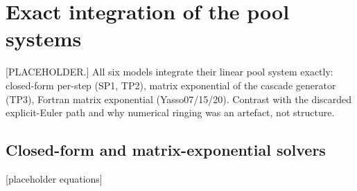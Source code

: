 \documentclass[../HIKET_draft_v1.tex]{subfiles}
\begin{document}
\section{Exact integration of the pool systems}
\label{app:exact}

[PLACEHOLDER.] All six models integrate their linear pool system exactly:
closed-form per-step (SP1, TP2), matrix exponential of the cascade generator
(TP3), Fortran matrix exponential (Yasso07/15/20). Contrast with the discarded
explicit-Euler path and why numerical ringing was an artefact, not structure.

\subsection{Closed-form and matrix-exponential solvers}
[placeholder equations]
\end{document}
